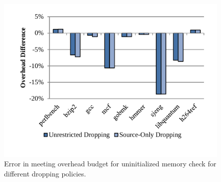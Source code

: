 \begin{figure}
  \begin{center}
    \includegraphics[width=\columnwidth]{figs/data_umc_exec_time.pdf}
    \vspace{-0.2in}
    \caption{Error in meeting overhead budget for uninitialized memory check for different dropping policies.}
    \label{fig:evaluation.umc_exec_time}
    \vspace{-0.2in}
  \end{center}
\end{figure}


